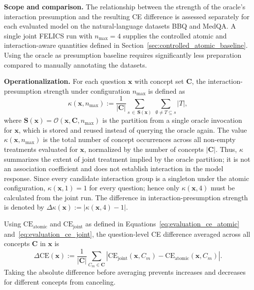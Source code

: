\noindent\textbf{Scope and comparison.} The relationship between the strength of the oracle's interaction presumption and the resulting CE difference is assessed separately for each evaluated model on the natural-language datasets BBQ and MedQA. A single joint FELICS run with $n_{\max}=4$ supplies the controlled atomic and interaction-aware quantities defined in Section~\ref{sec:controlled_atomic_baseline}. Using the oracle as presumption baseline requires significantly less preparation compared to manually annotating the datasets.

\noindent\textbf{Operationalization.} For each question $\mathbf{x}$ with concept set $\mathbf{C}$, the interaction-presumption strength under configuration $n_{\max}$ is defined as
\begin{equation}
	\kappa(\mathbf{x}, n_{\max}) := \frac{1}{|\mathbf{C}|} \sum_{s \,\in\, \mathbf{S}(\mathbf{x})} \ \sum_{\emptyset \neq T \subseteq s} |T|,
\end{equation}
where $\mathbf{S}(\mathbf{x})=\mathcal{O}(\mathbf{x},\mathbf{C},n_{\max})$ is the partition from a single oracle invocation for $\mathbf{x}$, which is stored and reused instead of querying the oracle again. The value $\kappa(\mathbf{x},n_{\max})$ is the total number of concept occurrences across all non-empty treatments evaluated for $\mathbf{x}$, normalized by the number of concepts $|\mathbf{C}|$. Thus, $\kappa$ summarizes the extent of joint treatment implied by the oracle partition; it is not an association coefficient and does not establish interaction in the model response. Since every candidate interaction group is a singleton under the atomic configuration, $\kappa(\mathbf{x},1)=1$ for every question; hence only $\kappa(\mathbf{x},4)$ must be calculated from the joint run. The difference in interaction-presumption strength is denoted by $\Delta\kappa(\mathbf{x}) := |\kappa(\mathbf{x},4)-1|$.

Using $\mathrm{CE}_{\mathrm{atomic}}$ and $\mathrm{CE}_{\mathrm{joint}}$ as defined in Equations~\ref{eq:evaluation_ce_atomic} and~\ref{eq:evaluation_ce_joint}, the question-level CE difference averaged across all concepts $\mathbf{C}$ in $\mathbf{x}$ is
\begin{equation}
	\Delta \mathrm{CE}(\mathbf{x}) := \frac{1}{|\mathbf{C}|}\sum_{C_m\in\mathbf{C}}
	\left|\mathrm{CE}_{\mathrm{joint}}(\mathbf{x},C_m)-\mathrm{CE}_{\mathrm{atomic}}(\mathbf{x},C_m)\right|.
\end{equation}
Taking the absolute difference before averaging prevents increases and decreases for different concepts from canceling.

